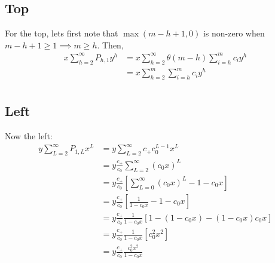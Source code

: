 	\subsection{Top}
	For the top, lets first note that $\max(m - h + 1, 0)$ is non-zero when $m - h + 1 \ge 1 \implies m \ge h$. Then,
	\begin{align}
		x\sum_{h=2}^\infty P_{h, 1} y^h &= x \sum_{h=2}^\infty \theta(m - h)\sum_{i=h}^m c_i y^h\\
		&= x\sum_{h=2}^m \sum_{i=h}^m c_i y^h \\
	\end{align}
	\subsection{Left}
	Now the left:
	\begin{align}
		y\sum_{L=2}^\infty P_{1,L} x^L &= y\sum_{L=2}^\infty c_+ c_0^{L-1} x^L \\
		&= y\frac{c_+}{c_0}\sum_{L=2}^\infty (c_0x)^L \\
		&= y\frac{c_+}{c_0}\left[\sum_{L=0}^\infty (c_0x)^L - 1 - c_0x\right]\\
		&= y\frac{c_+}{c_0}\left[\frac{1}{1-c_0x} - 1 - c_0x\right]\\
		&= y\frac{c_+}{c_0}\frac{1}{1-c_0x}\left[1 - (1-c_0x) - (1-c_0x)c_0x\right]\\
		&= y\frac{c_+}{c_0}\frac{1}{1-c_0x}\left[c_0^2x^2\right]\\
		&= y\frac{c_+}{c_0}\frac{c_0^2x^2}{1-c_0x}\\
	\end{align}
